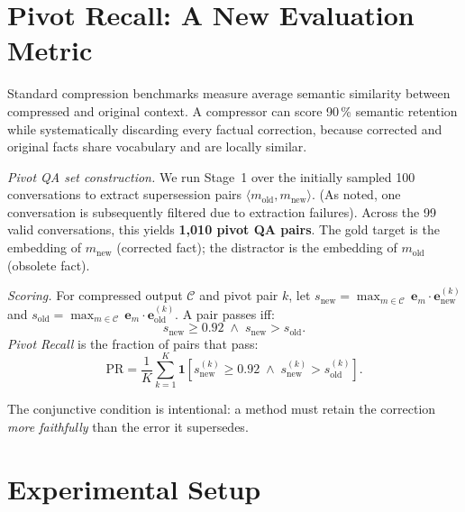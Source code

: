 \documentclass[conference]{IEEEtran}
\newcommand{\PR}{\textit{Pivot Recall}}
\begin{document}
\section{Pivot Recall: A New Evaluation Metric}
\label{sec:metric}

Standard compression benchmarks measure average semantic similarity between
compressed and original context. A compressor can score 90\,\% semantic
retention while systematically discarding every factual correction, because
corrected and original facts share vocabulary and are locally similar.

\textit{Pivot QA set construction.}
We run Stage~1 over the initially sampled 100 conversations to extract supersession pairs
$\langle m_\text{old}, m_\text{new}\rangle$. (As noted, one conversation is subsequently filtered due to extraction failures). Across the 99 valid conversations, this yields \textbf{1,010 pivot QA pairs}. The gold target is the embedding
of $m_\text{new}$ (corrected fact); the distractor is the embedding of
$m_\text{old}$ (obsolete fact).

\textit{Scoring.}
For compressed output $\mathcal{C}$ and pivot pair $k$, let
$s_\text{new} = \max_{m \in \mathcal{C}}\,\mathbf{e}_m \cdot
\mathbf{e}_\text{new}^{(k)}$ and
$s_\text{old} = \max_{m \in \mathcal{C}}\,\mathbf{e}_m \cdot
\mathbf{e}_\text{old}^{(k)}$.
A pair passes iff:
\begin{equation}
  s_\text{new} \geq 0.92 \;\wedge\; s_\text{new} > s_\text{old}.
\end{equation}
\PR{} is the fraction of pairs that pass:
\begin{equation}
  \text{PR} = \frac{1}{K}\sum_{k=1}^{K}
  \mathbf{1}\!\left[s^{(k)}_\text{new} \geq 0.92
               \;\wedge\; s^{(k)}_\text{new} > s^{(k)}_\text{old}\right].
\end{equation}

The conjunctive condition is intentional: a method must retain the correction
\emph{more faithfully} than the error it supersedes.

\section{Experimental Setup}
\label{sec:setup}
\end{document}
